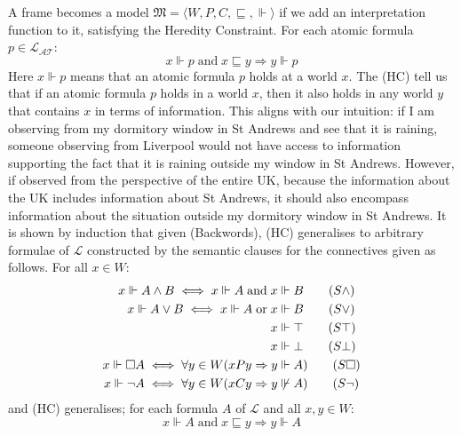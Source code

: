 A frame becomes a model $\mathfrak{M} = \langle W, P, C, \sqsubseteq, \Vdash \rangle$ if we add an interpretation function to it, satisfying the Heredity Constraint. For each atomic formula $p \in \mathcal{L_{AT}}$:
\begin{equation}
    x \Vdash p \;\textrm{and}\; x \sqsubseteq y \Rightarrow y \Vdash p \tag{HC}
\end{equation}
Here $x \Vdash p$ means that an atomic formula $p$ holds at a world $x$. The (HC) tell us that if an atomic formula $p$ holds in a world $x$, then it also holds in any world $y$ that contains $x$ in terms of information. This aligns with our intuition: if I am observing from my dormitory window in St Andrews and see that it is raining, someone observing from Liverpool would not have access to information supporting the fact that it is raining outside my window in St Andrews. However, if observed from the perspective of the entire UK, because the information about the UK includes information about St Andrews, it should also encompass information about the situation outside my dormitory window in St Andrews. It is shown by induction that given (Backwords), (HC) generalises to arbitrary formulae of $\mathcal{L}$ constructed by the semantic clauses for the connectives given as follows. For all $x \in W$:
\begin{align}
  x \Vdash A \land B \iff x \Vdash A \;\textrm{and}\; x &\Vdash B \tag{$S\land$} \\
  x \Vdash A \lor B \iff x \Vdash A \;\textrm{or}\; x &\Vdash B \tag{$S\lor$} \\
  x &\Vdash \top \tag{$S\top$} \\
  x &\Vdash \bot \tag{$S\bot$} \\
  x \Vdash \bx A \iff \forall y \in W (xPy \Rightarrow y &\Vdash A) \tag{$S\bx$} \\
  x \Vdash \neg A \iff \forall y \in W (xCy \Rightarrow y &\not\Vdash A) \tag{$S\neg$}
\end{align}
and (HC) generalises; for each formula $A$ of $\mathcal{L}$ and all $x, y \in W$:
\begin{equation}
    x \Vdash A \;\textrm{and}\; x \sqsubseteq y \Rightarrow y \Vdash A \tag{HC'}
\end{equation}
